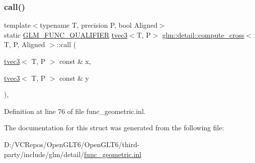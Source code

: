 \subsubsection{\texorpdfstring{call()}{call()}}
{\footnotesize\ttfamily template$<$typename T, precision P, bool Aligned$>$ \\
static \mbox{\hyperlink{setup_8hpp_a33fdea6f91c5f834105f7415e2a64407}{G\+L\+M\+\_\+\+F\+U\+N\+C\+\_\+\+Q\+U\+A\+L\+I\+F\+I\+ER}} \mbox{\hyperlink{structglm_1_1tvec3}{tvec3}}$<$T, P$>$ \mbox{\hyperlink{structglm_1_1detail_1_1compute__cross}{glm\+::detail\+::compute\+\_\+cross}}$<$ T, P, Aligned $>$\+::call (\begin{DoxyParamCaption}\item[{\mbox{\hyperlink{structglm_1_1tvec3}{tvec3}}$<$ T, P $>$ const \&}]{x,  }\item[{\mbox{\hyperlink{structglm_1_1tvec3}{tvec3}}$<$ T, P $>$ const \&}]{y }\end{DoxyParamCaption})\hspace{0.3cm}{\ttfamily [inline]}, {\ttfamily [static]}}



Definition at line 76 of file func\+\_\+geometric.\+inl.



The documentation for this struct was generated from the following file\+:\begin{DoxyCompactItemize}
\item 
D\+:/\+V\+C\+Repos/\+Open\+G\+L\+T6/\+Open\+G\+L\+T6/third-\/party/include/glm/detail/\mbox{\hyperlink{func__geometric_8inl}{func\+\_\+geometric.\+inl}}\end{DoxyCompactItemize}
